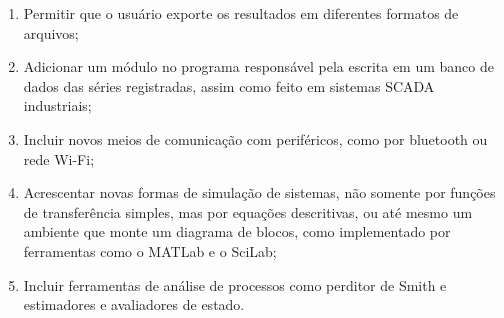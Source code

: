 \begin{enumerate}
	\item Permitir que o usuário exporte os resultados em diferentes formatos de arquivos;
	\item Adicionar um módulo no programa responsável pela escrita em um banco de dados das séries registradas, assim como feito em sistemas SCADA industriais;
	\item Incluir novos meios de comunicação com periféricos, como por bluetooth ou rede Wi-Fi;
	\item Acrescentar novas formas de simulação de sistemas, não somente por funções de transferência simples, mas por equações descritivas, ou até mesmo um ambiente que monte um diagrama de blocos, como implementado por ferramentas como o MATLab\textsuperscript{\tiny \textregistered} e o SciLab;
	\item Incluir ferramentas de análise de processos como perditor de Smith e estimadores e avaliadores de estado.
\end{enumerate}